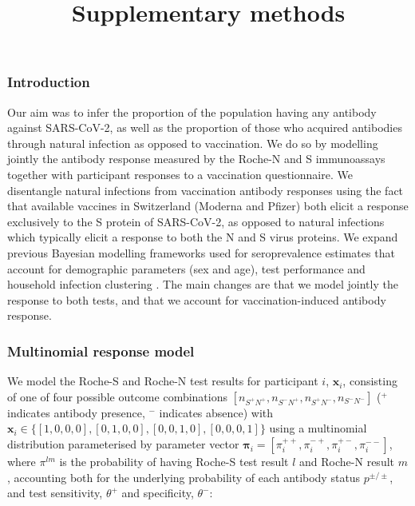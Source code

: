 \documentclass{article}
\title{Supplementary methods}
\date{\vspace{-10ex}}
\begin{document}
\maketitle

\hypertarget{introduction}{%
\subsubsection*{Introduction}\label{introduction}}

Our aim was to infer the proportion of the population having any
antibody against SARS-CoV-2, as well as the proportion of those who
acquired antibodies through natural infection as opposed to vaccination.
We do so by modelling jointly the antibody response measured by the
Roche-N and S immunoassays together with participant responses to a
vaccination questionnaire. We disentangle natural infections from
vaccination antibody responses using the fact that available vaccines in
Switzerland (Moderna and Pfizer) both elicit a response exclusively to
the S protein of SARS-CoV-2, as opposed to natural infections which
typically elicit a response to both the N and S virus proteins. We
expand previous Bayesian modelling frameworks used for seroprevalence
estimates that account for demographic parameters (sex and age), test
performance and household infection clustering \cite{stringhini2020lancet,stringhini2021_sp2}. The
main changes are that we model jointly the response to both tests, and
that we account for vaccination-induced antibody response.

\hypertarget{multinomial-response-model}{%
\subsubsection*{Multinomial response
model}\label{multinomial-response-model}}

We model the Roche-S and Roche-N test results for participant $i$,
$\boldsymbol{x}_i$, consisting of one of four possible outcome
combinations $[n_{S^+N^+}, n_{S^-N^+}, n_{S^+N^-}, n_{S^-N^-}]$ (${}^+$ indicates antibody presence, ${}^-$ indicates absence) with
$\boldsymbol{x}_i \in \{[1, 0, 0, 0], [0, 1, 0, 0], [0, 0, 1, 0], [0, 0, 0, 1]\}$
using a multinomial distribution parameterised by parameter vector
$\boldsymbol{\pi}_i = [\pi_i^{++}, \pi_i^{-+}, \pi_i^{+-}, \pi_i^{--}]$,
where $\pi^{lm}$ is the probability of having Roche-S test result
$l$ and Roche-N result $m$, accounting both for the underlying
probability of each antibody status $p^{\pm/\pm}$, and test
sensitivity, $\theta^+$ and specificity, $\theta^-$:
\end{document}
